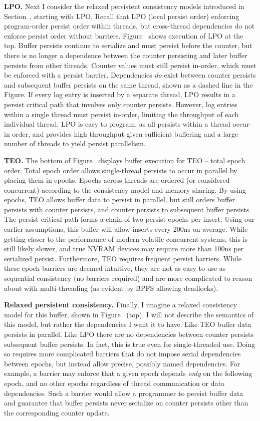 \textbf{LPO.} Next I consider the relaxed persistent consistency models introduced in Section~, starting with LPO.
Recall that LPO (local persist order) enforcing program-order persist order within threads, but cross-thread dependencies do not enforce persist order without barriers.
Figure~ shows execution of LPO at the top.
Buffer persists continue to serialize and must persist before the counter, but there is no longer a dependence between the counter persisting and later buffer persists from other threads.
Counter values must still persist in-order, which must be enforced with a persist barrier.
Dependencies \emph{do} exist between counter persists and subsequent buffer persists on the same thread, shown as a dashed line in the Figure.
If every log entry is inserted by a separate thread, LPO results in a persist critical path that involves only counter persists.
However, log entries within a single thread must persist in-order, limiting the throughput of each individual thread.
LPO is easy to program, as all persists within a thread occur-in order, and provides high throughput given sufficient buffering and a large number of threads to yield persist parallelism.

\textbf{TEO.} The bottom of Figure~ displays buffer execution for TEO -- total epoch order.
Total epoch order allows single-thread persists to occur in parallel by placing them in epochs.
Epochs across threads are ordered (or considered concurrent) according to the consistency model and memory sharing.
By using epochs, TEO allows buffer data to persist in parallel, but still orders buffer persists with counter persists, and counter persists to subsequent buffer persists.
The persist critical path forms a chain of two persist epochs per insert.
Using our earlier assumptions, this buffer will allow inserts every 200ns on average.
While getting closer to the performance of modern volatile concurrent systems, this is still likely slower, and true NVRAM devices may require more than 100ns per serialized persist.
Furthermore, TEO requires frequent persist barriers.
While these epoch barriers are deemed intuitive, they are not as easy to use as sequential consistency (no barriers required) and are more complicated to reason about with multi-threading (as evident by BPFS allowing deadlocks).

\textbf{Relaxed persistent consistency.}
Finally, I imagine a relaxed consistency model for this buffer, shown in Figure~ (top).
I will not describe the semantics of this model, but rather the dependencies I want it to have.
Like TEO buffer data persists in parallel.
Like LPO there are no dependencies between counter persists subsequent buffer persists.
In fact, this is true even for single-threaded use.
Doing so requires more complicated barriers that do not impose serial dependencies between epochs, but instead allow precise, possibly named dependencies.
For example, a barrier may enforce that a given epoch depends \emph{only} on the following epoch, and no other epochs regardless of thread communication or data dependencies.
Such a barrier would allow a programmer to persist buffer data and guarantee that buffer persists never serialize on counter persists other than the corresponding counter update.

